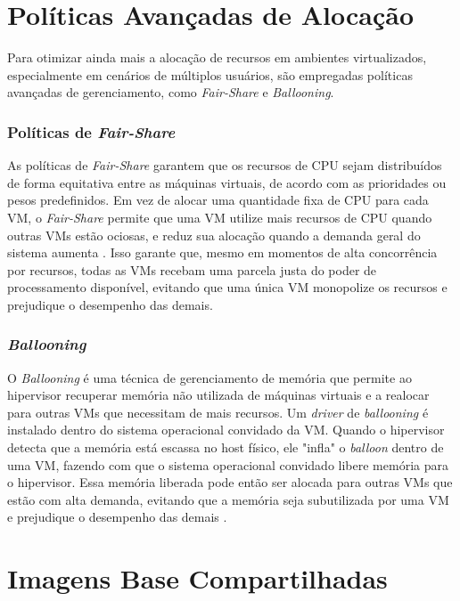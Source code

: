 \section{Políticas Avançadas de Alocação}
\label{sec:politicas_alocacao}

Para otimizar ainda mais a alocação de recursos em ambientes virtualizados, especialmente em cenários de múltiplos usuários, são empregadas políticas avançadas de gerenciamento, como \textit{Fair-Share} e \textit{Ballooning}.

\subsubsection*{Políticas de \textit{Fair-Share}}
As políticas de \textit{Fair-Share} garantem que os recursos de CPU sejam distribuídos de forma equitativa entre as máquinas virtuais, de acordo com as prioridades ou pesos predefinidos. Em vez de alocar uma quantidade fixa de CPU para cada VM, o \textit{Fair-Share} permite que uma VM utilize mais recursos de CPU quando outras VMs estão ociosas, e reduz sua alocação quando a demanda geral do sistema aumenta \cite{kim2019}. Isso garante que, mesmo em momentos de alta concorrência por recursos, todas as VMs recebam uma parcela justa do poder de processamento disponível, evitando que uma única VM monopolize os recursos e prejudique o desempenho das demais.

\subsubsection*{\textit{Ballooning}}
O \textit{Ballooning} é uma técnica de gerenciamento de memória que permite ao hipervisor recuperar memória não utilizada de máquinas virtuais e a realocar para outras VMs que necessitam de mais recursos. Um \textit{driver} de \textit{ballooning} é instalado dentro do sistema operacional convidado da VM. Quando o hipervisor detecta que a memória está escassa no host físico, ele "infla" o \textit{balloon} dentro de uma VM, fazendo com que o sistema operacional convidado libere memória para o hipervisor. Essa memória liberada pode então ser alocada para outras VMs que estão com alta demanda, evitando que a memória seja subutilizada por uma VM e prejudique o desempenho das demais \cite{wang2015}.

\section{Imagens Base Compartilhadas}
\label{sec:imagens_base}

